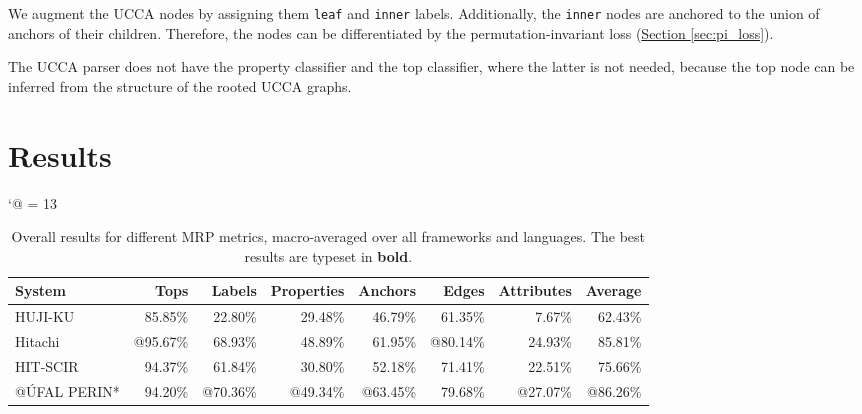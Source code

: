 \documentclass[11pt,a4paper]{article}
\newcommand{\secref}[1]{\hyperref[#1]{Section \ref*{#1}}}
\begin{document}
We augment the UCCA nodes by assigning them \texttt{leaf} and \texttt{inner} labels. Additionally, the \texttt{inner} nodes are anchored to the union of anchors of their children. Therefore, the nodes can be differentiated by the permutation-invariant loss (\secref{sec:pi_loss}).

The UCCA parser does not have the property classifier and the top classifier, where the latter is not needed, because the top node can be inferred from the structure of the rooted UCCA graphs. 





 \section{Results}


\begin{table*}[t]
\small
\centering
\def\-{\rule[.5ex]{2em}{0.5pt}\kern1em}
\catcode`@ = 13
\begin{tabular}{@{}lrrrrrrr@{}}
\toprule
\textbf{System} & \textbf{Tops} & \textbf{Labels} & \textbf{Properties} & \textbf{Anchors} & \textbf{Edges} & \textbf{Attributes} & \textbf{Average} \\ \midrule
HUJI-KU \cite{Arv:Cui:Her:20} & 85.85\% & 22.80\% & 29.48\% & 46.79\% & 61.35\% &  7.67\% & 62.43\% \\
Hitachi \cite{Oza:Mor:Kor:20} &@95.67\% & 68.93\% & 48.89\% & 61.95\% &@80.14\% & 24.93\% & 85.81\% \\
HIT-SCIR \cite{Dou:Fen:Ji:20} & 94.37\% & 61.84\% & 30.80\% & 52.18\% & 71.41\% & 22.51\% & 75.66\% \\
@ÚFAL PERIN*  & 94.20\% &@70.36\% &@49.34\% &@63.45\% & 79.68\% &@27.07\% &@86.26\% \\ \bottomrule
\end{tabular}\caption{Overall results for different MRP metrics, macro-averaged over all frameworks and languages. The best results are typeset in \textbf{bold}.}
\label{tab:score_result}
\end{table*}
\end{document}
